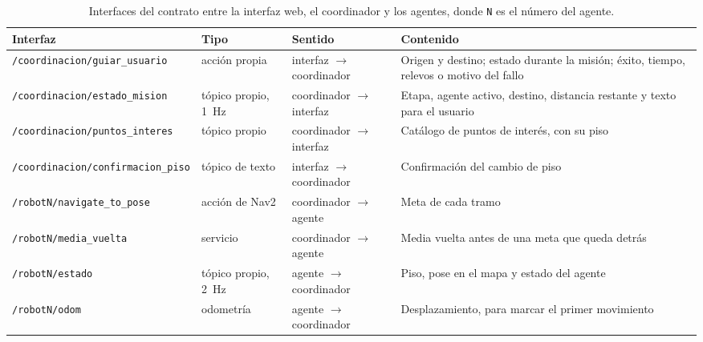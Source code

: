 \begin{table}[H]
  \centering\footnotesize{}
  \caption{Interfaces del contrato entre la interfaz web, el coordinador y los agentes, donde \texttt{N} es el número del agente.}
  \label{tab:contrato}
  \begin{tabular}{@{}>{\scriptsize\raggedright\arraybackslash}p{}>{\raggedright\arraybackslash}p{}>{\raggedright\arraybackslash}p{}>{\raggedright\arraybackslash}p{}@{}}
    \toprule
    \footnotesize\textbf{Interfaz} & \textbf{Tipo} & \textbf{Sentido} & \textbf{Contenido} \\ \midrule
    \texttt{/coordinacion/guiar\_usuario} & acción propia & interfaz $\rightarrow$ coordinador & Origen y destino; estado durante la misión; éxito, tiempo, relevos o motivo del fallo \\
    \texttt{/coordinacion/estado\_mision} & tópico propio, 1~Hz & coordinador $\rightarrow$ interfaz & Etapa, agente activo, destino, distancia restante y texto para el usuario \\
    \texttt{/coordinacion/puntos\_interes} & tópico propio & coordinador $\rightarrow$ interfaz & Catálogo de puntos de interés, con su piso \\
    \texttt{/coordinacion/confirmacion\_piso} & tópico de texto & interfaz $\rightarrow$ coordinador & Confirmación del cambio de piso \\
    \texttt{/robotN/navigate\_to\_pose} & acción de Nav2 & coordinador $\rightarrow$ agente & Meta de cada tramo \\
    \texttt{/robotN/media\_vuelta} & servicio & coordinador $\rightarrow$ agente & Media vuelta antes de una meta que queda detrás \\
    \texttt{/robotN/estado} & tópico propio, 2~Hz & agente $\rightarrow$ coordinador & Piso, pose en el mapa y estado del agente \\
    \texttt{/robotN/odom} & odometría & agente $\rightarrow$ coordinador & Desplazamiento, para marcar el primer movimiento \\ \bottomrule
  \end{tabular}
\end{table}

